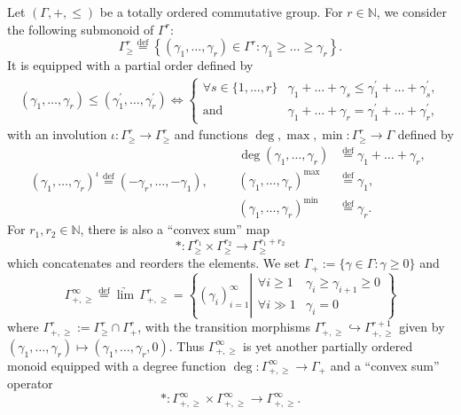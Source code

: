 \documentclass[11pt]{article}
\theoremstyle{definition}
\numberwithin{equation}{section}
\numberwithin{figure}{section}
\numberwithin{table}{section}
\newcommand{\eqd}{\stackrel{\mathrm{def}}{=}}
\let\oldforall\forall
\renewcommand*{\forall}{\mathrel{\oldforall}}
\begin{document}
Let $(\Gamma,+,\leq)$ be a totally ordered commutative group. For $r\in\mathbb{N}$, we consider the following submonoid of $\Gamma^{r}$:
\[
\Gamma_{\geq}^{r}\eqd\left\{ (\gamma_{1},\dots,\gamma_{r})\in\Gamma^{r}:\gamma_{1}\geq\dots\geq\gamma_{r}\right\}.
\]
It is equipped with a partial order defined by
\begin{multline*}
(\gamma_{1},\dots,\gamma_{r})\leq(\gamma_{1}^{\prime},\dots,\gamma_{r}^{\prime})\iff\!
\begin{cases}
\forall s\in\{1,\dots,r\}\! & \gamma_{1}+\dots+\gamma_{s}\leq\gamma_{1}^{\prime}+\dots+\gamma_{s}^{\prime},\\
\text{and} & \gamma_{1}+\dots+\gamma_{r}=\gamma_{1}^{\prime}+\dots+\gamma_{r}^{\prime},
\end{cases}\!\!
\end{multline*}
with an involution $\iota:\Gamma_{\geq}^{r}\rightarrow\Gamma_{\geq}^{r}$ and functions $\deg,\max,\min:\Gamma_{\geq}^{r}\rightarrow\Gamma$ defined by
\[
(\gamma_{1},\dots,\gamma_{r})^{\iota}\eqd(-\gamma_{r},\dots,-\gamma_{1}),\qquad
\begin{aligned}
\deg(\gamma_{1},\dots,\gamma_{r}) & \eqd \gamma_{1}+\dots+\gamma_{r},\\
(\gamma_{1},\dots,\gamma_{r})^{\max} & \eqd \gamma_{1},\\
(\gamma_{1},\dots,\gamma_{r})^{\min} & \eqd \gamma_{r}.
\end{aligned}
\]
For $r_{1},r_{2}\in\mathbb{N}$, there is also a ``convex sum'' map
\[
\ast:\Gamma_{\geq}^{r_{1}}\times\Gamma_{\geq}^{r_{2}}\rightarrow\Gamma_{\geq}^{r_{1}+r_{2}}
\]
which concatenates and reorders the elements. We set $\Gamma_{+}:=\{\gamma\in\Gamma:\gamma\geq0\}$ and
\[
\Gamma_{+,\geq}^{\infty}\eqd\underrightarrow{\lim}\,\Gamma_{+,\geq}^{r}=\left\{ (\gamma_{i})_{i=1}^{\infty}\left|
\begin{array}{ll}
\forall i\geq1 & \gamma_{i}\geq\gamma_{i+1}\geq0\\
\forall i\gg1 & \gamma_{i}=0
\end{array}\right.\right\}
\]
where $\Gamma_{+,\geq}^{r}:=\Gamma_{\geq}^{r}\cap\Gamma_{+}^{r}$, with the transition morphisms $\Gamma_{+,\geq}^{r}\hookrightarrow\Gamma_{+,\geq}^{r+1}$ given by $(\gamma_{1},\dots,\gamma_{r})\mapsto(\gamma_{1},\dots,\gamma_{r},0)$. Thus $\Gamma_{+,\geq}^{\infty}$ is yet another partially ordered monoid equipped with a degree function $\deg:\Gamma_{+,\geq}^{\infty}\rightarrow\Gamma_{+}$ and a ``convex sum'' operator
\[
\ast:\Gamma_{+,\geq}^{\infty}\times\Gamma_{+,\geq}^{\infty}\rightarrow\Gamma_{+,\geq}^{\infty}.
\]
\end{document}
